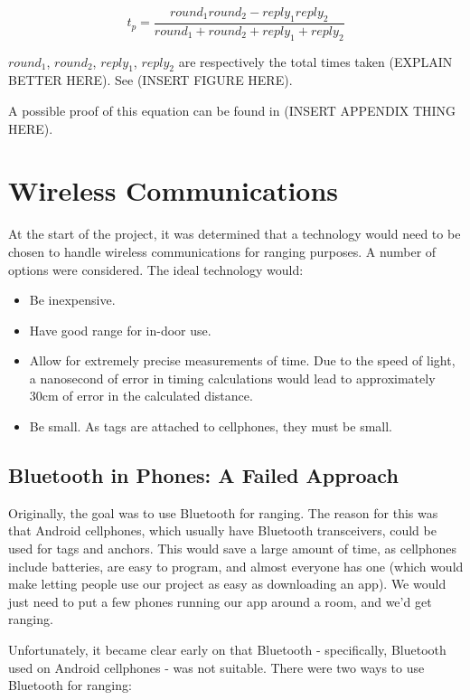 \[
	t_p = \frac{round_1  round_2 - reply_1 reply_2}{ round_1 + round_2 + reply_1 + reply_2}
\]

$round_1$, $round_2$, $reply_1$, $reply_2$ are respectively the total times taken (EXPLAIN BETTER HERE). See (INSERT FIGURE HERE).
 
A possible proof of this equation can be found in (INSERT APPENDIX THING HERE).

\section{Wireless Communications}
At the start of the project, it was determined that a technology would need to be chosen to handle wireless communications for ranging purposes. A number of options were considered. The ideal technology would:
\begin{itemize}
	\item Be inexpensive.
	\item Have good range for in-door use.
	\item Allow for extremely precise measurements of time. Due to the speed of light, a nanosecond of error in timing calculations would lead to approximately 30cm of error in the calculated distance.
	\item Be small. As tags are attached to cellphones, they must be small.
\end{itemize}

\subsection{Bluetooth in Phones: A Failed Approach}
Originally, the goal was to use Bluetooth for ranging. The reason for this was that Android cellphones, which usually have Bluetooth transceivers, could be used for tags and anchors. This would save a large amount of time, as cellphones include batteries, are easy to program, and almost everyone has one (which would make letting people use our project as easy as downloading an app). We would just need to put a few phones running our app around a room, and we'd get ranging.

Unfortunately, it became clear early on that Bluetooth - specifically, Bluetooth used on Android cellphones - was not suitable. There were two ways to use Bluetooth for ranging: 

